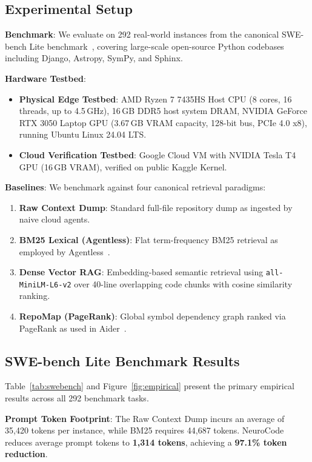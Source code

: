 \documentclass{article}
\begin{document}
\subsection{Experimental Setup}

\textbf{Benchmark}: We evaluate on 292 real-world instances from the canonical SWE-bench Lite benchmark~\cite{jimenez2024swebench}, covering large-scale open-source Python codebases including Django, Astropy, SymPy, and Sphinx.

\textbf{Hardware Testbed}:
\begin{itemize}
    \item \textbf{Physical Edge Testbed}: AMD Ryzen 7 7435HS Host CPU (8 cores, 16 threads, up to 4.5\,GHz), 16\,GB DDR5 host system DRAM, NVIDIA GeForce RTX 3050 Laptop GPU (3.67\,GB VRAM capacity, 128-bit bus, PCIe 4.0 x8), running Ubuntu Linux 24.04 LTS.
    \item \textbf{Cloud Verification Testbed}: Google Cloud VM with NVIDIA Tesla T4 GPU (16\,GB VRAM), verified on public Kaggle Kernel.
\end{itemize}

\textbf{Baselines}: We benchmark against four canonical retrieval paradigms:
\begin{enumerate}
    \item \textbf{Raw Context Dump}: Standard full-file repository dump as ingested by naive cloud agents.
    \item \textbf{BM25 Lexical (Agentless)}: Flat term-frequency BM25 retrieval as employed by Agentless~\cite{xia2024agentless}.
    \item \textbf{Dense Vector RAG}: Embedding-based semantic retrieval using \texttt{all-MiniLM-L6-v2} over 40-line overlapping code chunks with cosine similarity ranking.
    \item \textbf{RepoMap (PageRank)}: Global symbol dependency graph ranked via PageRank as used in Aider~\cite{aider2024repomap}.
\end{enumerate}

\subsection{SWE-bench Lite Benchmark Results}

Table~\ref{tab:swebench} and Figure~\ref{fig:empirical} present the primary empirical results across all 292 benchmark tasks.

\textbf{Prompt Token Footprint}: The Raw Context Dump incurs an average of 35,420 tokens per instance, while BM25 requires 44,687 tokens. NeuroCode reduces average prompt tokens to \textbf{1,314 tokens}, achieving a \textbf{97.1\% token reduction}.
\end{document}

